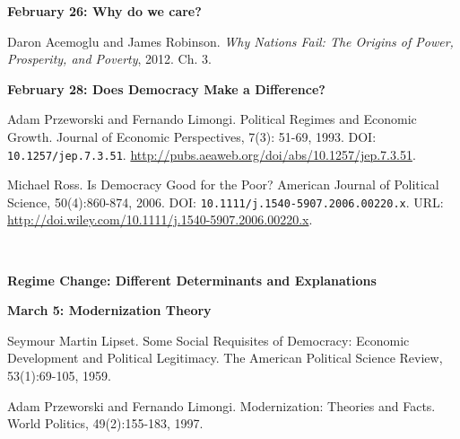 \documentclass[letterpaper]{article}
\renewenvironment{itemize}{
  \begin{list}{}{
    \setlength{\leftmargin}{1.5em}
  }
}{
  \end{list}
}
\begin{document}
\begin{enumerate}
	\begin{itemize} 
		\item[] {\bf February 26: Why do we care?}
			\begin{itemize} 
				\item[$\bullet$] Daron Acemoglu and James Robinson. \emph{Why Nations Fail: The Origins of Power, Prosperity, and Poverty}, 2012. Ch. 3.
			\end{itemize}
	\end{itemize}

	\begin{itemize} 
		\item {\bf February 28: Does Democracy Make a Difference?}
			\begin{itemize} 
				\item[$\bullet$] Adam Przeworski and Fernando Limongi. Political Regimes and Economic Growth. Journal of Economic Perspectives, 7(3): 51-69, 1993. DOI: \texttt{10.1257/jep.7.3.51}. \url{http://pubs.aeaweb.org/doi/abs/10.1257/jep.7.3.51}.
				\item[$\bullet$] Michael Ross. Is Democracy Good for the Poor? American Journal of Political Science, 50(4):860-874,  2006. DOI: \texttt{10.1111/j.1540-5907.2006.00220.x}. URL: \url{http://doi.wiley.com/10.1111/j.1540-5907.2006.00220.x}.
			\end{itemize}
	\end{itemize}


\vspace{2mm}\\
\vspace{2mm}


\item {\bf Regime Change: Different Determinants and Explanations}
	\begin{itemize} {\bf March 5: Modernization Theory}
				\begin{itemize}
					\item[$\bullet$] Seymour Martin Lipset. Some Social Requisites of Democracy: Economic Development and Political Legitimacy. The American Political Science Review, 53(1):69-105, 1959.
					\item[$\bullet$] Adam Przeworski and Fernando Limongi. Modernization: Theories and Facts. World Politics, 49(2):155-183, 1997.
				\end{itemize}


\end{itemize}
\end{enumerate}
\end{document}
